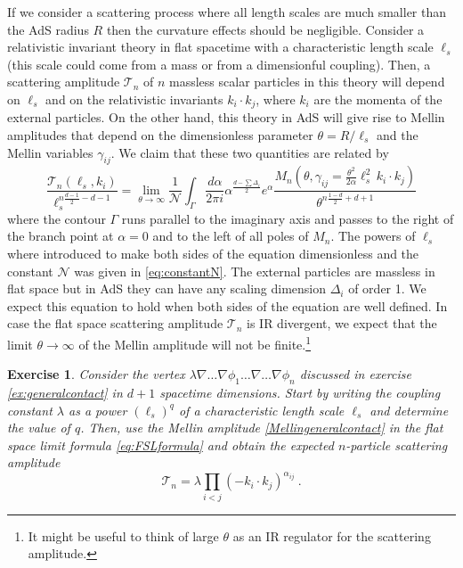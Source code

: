 \documentclass{ws-rv9x6}
\newtheorem{exercise}{Exercise}[section]
\newcommand\be{\begin{equation}}
\newcommand\ee{\end{equation}}
\newcommand\D{\Delta}
\newcommand\g{\gamma}
\begin{document}
If we consider a scattering process where all length scales are much smaller than the AdS radius $R$ then the curvature effects should be negligible.
Consider a relativistic invariant theory in flat spacetime with a characteristic length scale $\ell_s$ (this scale could come from a mass or from a dimensionful coupling). Then, a scattering amplitude $\mathcal{T}_n$ of $n$ massless scalar particles in this theory will depend on $\ell_s$ and on the relativistic invariants $k_i\cdot k_j$, where $k_i$ are the momenta of the external particles.
On the other hand, this theory in AdS will give rise to Mellin amplitudes that depend on the dimensionless parameter $\theta=R/\ell_s$ and the Mellin variables $\g_{ij}$.
We claim that these two quantities are related by 
\be
\frac{\mathcal{T}_n(\ell_s,k_i)}{\ell_s^{n\frac{d-1}{2}-d-1}}= 
 \lim_{\theta\to\infty} \frac{1}{\mathcal{N}}
\int_{\Gamma} \frac{d\alpha}{2\pi i} \alpha^{\frac{d-\sum\D_i}{2} } e^\alpha
\frac{M_n\left(\theta,\gamma_{ij}=\frac{\theta^2}{2\alpha} \ell_s^2\,k_i\cdot k_j \right)}{
\theta^{n\frac{1-d}{2}+d+1}}
\label{eq:FSLformula}
\ee
where the contour $\Gamma$ runs parallel to the imaginary axis and passes to the right of the branch point at $\alpha=0$ and to the left of all poles of $M_n$.
The powers of $\ell_s$ where introduced to make both sides of the equation dimensionless and the constant $\mathcal{N}$ was given in \eqref{eq:constantN}.
The external particles are massless in flat space but in AdS they can have any scaling dimension $\Delta_i$ of order 1.
We expect this equation to hold when both sides of the equation are well defined. In case the flat space scattering amplitude $\mathcal{T}_n$ is IR divergent, we expect that the limit $\theta \to \infty$ of the Mellin amplitude will not be finite.\footnote{It might be useful to think of large $\theta$ as an IR regulator for the scattering amplitude.}

\begin{exercise}
Consider the vertex $\lambda \nabla\dots \nabla \phi_1 \dots \nabla\dots\nabla \phi_n$ discussed in exercise \ref{ex:generalcontact} in $d+1$ spacetime dimensions. Start by writing the coupling constant $\lambda$ as a power $(\ell_s)^q$ of a characteristic length scale $\ell_s$ and determine the value of $q$.
Then, use the Mellin amplitude \eqref{Mellingeneralcontact} in the flat space limit formula \eqref{eq:FSLformula} and obtain the expected $n$-particle scattering amplitude  
\be
\mathcal{T}_n=\lambda \prod_{i<j} (-k_i\cdot k_j)^{\alpha_{ij}}\ .
\ee
\end{exercise}
\end{document}
